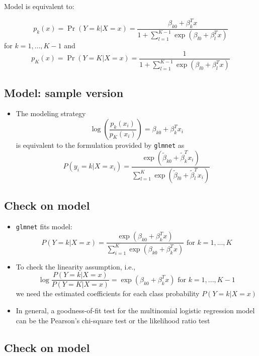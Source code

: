 \documentclass[]{article}
\providecommand{\tightlist}{%
  \setlength{\itemsep}{0pt}\setlength{\parskip}{0pt}}
\begin{document}
Model is equivalent to:

\[
p_{k}\left(  x\right) = \Pr(Y=k|X=x)=\frac{\beta_{k0}+\beta_{k}^{T}x}{1+\sum_{l=1}^{K-1}\exp(\beta_{l0}+\beta_{l}^{T}x)}
\] for \(k=1,\ldots,K-1\) and \[
p_{K}\left(  x\right) =\Pr(Y=K|X=x)=\frac{1}{1+\sum_{l=1}^{K-1}\exp(\beta_{l0}+\beta_{l}^{T}x)}
\]

\subsection{Model: sample version}\label{model-sample-version}

\begin{itemize}
\tightlist
\item
  The modeling strategy \[
  \log\left(  \frac{p_{k}\left(  x_i\right)  }{p_{K}\left(  x_i\right)  }\right)
  =\beta_{k0}+\beta_{k}^{T}x_{i}
  \] is equivalent to the formulation provided by \texttt{glmnet} as \[
  P\left(  y_{i}=k|X=x_{i}\right)  =\frac{\exp\left(  \tilde{\beta}_{k0}
  +\tilde{\beta}_{k}^{T}x_{i}\right)  }{\sum_{l=1}^{K}\exp\left(  \tilde{\beta
  }_{l0}+\tilde{\beta}_{l}^{T}x_{i}\right)  }%
  \]
\end{itemize}

\subsection{Check on model}\label{check-on-model}

\begin{itemize}
\item
  \texttt{glmnet} fits model: \[
  P\left(  Y=k|X=x\right)  =\frac{\exp\left(  \beta_{k0}+\beta_{k}^{T}x\right)
  }{\sum_{i=1}^{K}\exp\left(  \beta_{k0}+\beta_{k}^{T}x\right)  }\text{ for
  }k=1,...,K
  \]
\item
  To check the linearity assumption, i.e., \[
  \log\frac{P\left(  Y=k|X=x\right)  }{P\left(  Y=K|X=x\right)  }=\exp\left(
  \beta_{k0}+\beta_{k}^{T}x\right)  \text{ for }k=1,...,K-1
  \] we need the estimated coefficients for each class probability
  \(P\left(Y=k|X=x\right)\)
\item
  In general, a goodness-of-fit test for the multinomial logistic
  regression model can be the Pearson's chi-square test or the
  likelihood ratio test
\end{itemize}

\subsection{Check on model}\label{check-on-model-1}
\end{document}
